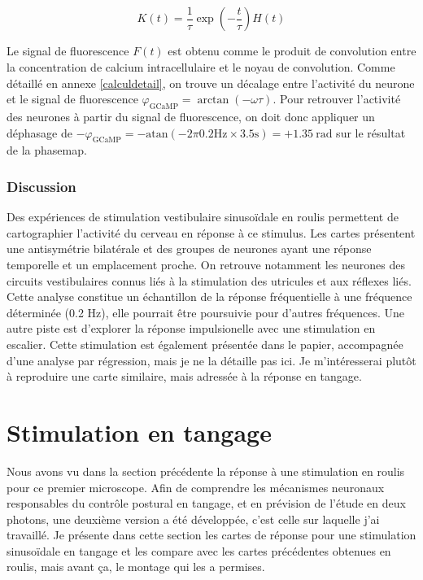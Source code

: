 $$
K(t) = \frac{1}{\tau}\exp\left(-\frac{t}{\tau}\right)H(t)
$$

Le signal de fluorescence $F(t)$ est obtenu comme le produit de convolution entre la concentration de calcium intracellulaire et le noyau de convolution. Comme détaillé en annexe \ref{calculdetail}, on trouve un décalage entre l'activité du neurone et le signal de fluorescence $\varphi_\text{GCaMP} = \arctan(-\omega\tau)$. Pour retrouver l'activité des neurones à partir du signal de fluorescence, on doit donc appliquer un déphasage de $ -\varphi_\text{GCaMP} = -\mathrm{atan}(-2\pi 0.2 \mathrm{Hz} \times 3.5 \mathrm{s}) = +1.35\ \mathrm{rad}$ sur le résultat de la phasemap.

\subsubsection{Discussion}

Des expériences de stimulation vestibulaire sinusoïdale en roulis permettent de cartographier l'activité du cerveau en réponse à ce stimulus. Les cartes présentent une antisymétrie bilatérale et des groupes de neurones ayant une réponse temporelle et un emplacement proche. On retrouve notamment les neurones des circuits vestibulaires connus liés à la stimulation des utricules et aux réflexes liés. Cette analyse constitue un échantillon de la réponse fréquentielle à une fréquence déterminée (0.2 Hz), elle pourrait être poursuivie pour d'autres fréquences. Une autre piste est d'explorer la réponse impulsionelle avec une stimulation en escalier. Cette stimulation est également présentée dans le papier, accompagnée d'une analyse par régression, mais je ne la détaille pas ici. Je m'intéresserai plutôt à reproduire une carte similaire, mais adressée à la réponse en tangage.


\section{Stimulation en tangage}\label{SECTIONtiltmicroscope1P}

Nous avons vu dans la section précédente la réponse à une stimulation en roulis pour ce premier microscope. Afin de comprendre les mécanismes neuronaux responsables du contrôle postural en tangage, et en prévision de l'étude en deux photons, une deuxième version a été développée, c'est celle sur laquelle j'ai travaillé. Je présente dans cette section les cartes de réponse pour une stimulation sinusoïdale en tangage et les compare avec les cartes précédentes obtenues en roulis, mais avant ça, le montage qui les a permises.

